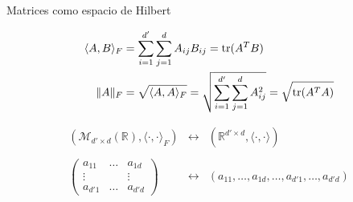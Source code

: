 \documentclass[10pt, compress]{beamer}
\newcommand\R{\mathbb{R}}
\begin{document}
\begin{frame}{Matrices como espacio de Hilbert}
  \begin{definition}
    \begin{align*}
      \langle A, B \rangle_F &= \sum_{i=1}^{d'} \sum_{j=1}^{d} A_{ij}B_{ij} = \operatorname{tr}(A^TB)  \\
      \|A\|_F &= \sqrt{\langle A, A \rangle_F} = \sqrt{\sum_{i=1}^{d'} \sum_{j=1}^{d} A_{ij}^2} = \sqrt{\operatorname{tr}(A^TA)}
    \end{align*}
  \end{definition}

  \begin{equation*}
    \begin{matrix}
      \left(\mathcal{M}_{d' \times d}(\R), \langle \cdot, \cdot \rangle_F\right) & \longleftrightarrow & \left(\R^{d' \times d}, \langle \cdot, \cdot \rangle \right) \\
      & & \\
      \begin{pmatrix}
        a_{11} & \dots & a_{1d} \\
        \vdots & & \vdots \\
        a_{d'1} & \dots & a_{d'd}
      \end{pmatrix} & \longleftrightarrow & (a_{11},\dots,a_{1d}, \dots, a_{d'1},\dots,a_{d'd})
    \end{matrix}
  \end{equation*}
\end{frame}
\end{document}
